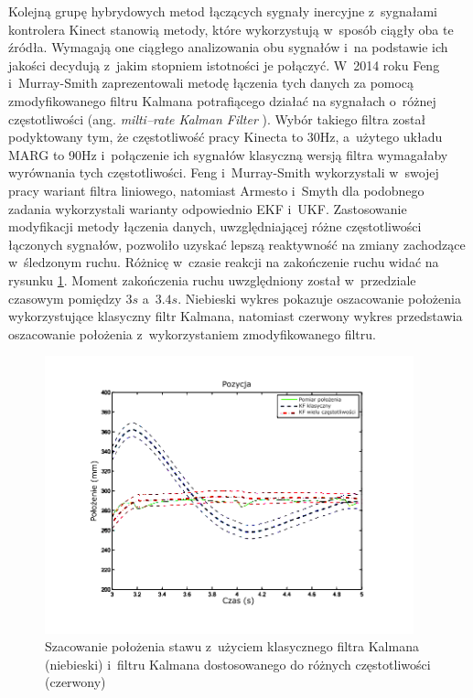 Kolejną grupę hybrydowych metod łączących sygnały inercyjne z~sygnałami kontrolera Kinect stanowią metody, które wykorzystują w~sposób ciągły oba te źródła. Wymagają one ciągłego analizowania obu sygnałów i~na podstawie ich jakości decydują z~jakim stopniem istotności je połączyć. W~2014 roku Feng i~Murray-Smith \cite{Murray-Smith2014} zaprezentowali metodę łączenia tych danych za pomocą zmodyfikowanego filtru Kalmana potrafiącego działać na sygnałach o~różnej częstotliwości (ang. \emph{milti--rate Kalman Filter} \cite{Dhuli2009}). Wybór takiego filtra został podyktowany tym, że częstotliwość pracy Kinecta to 30Hz, a~użytego układu MARG to 90Hz i~połączenie ich sygnałów klasyczną wersją filtra wymagałaby wyrównania tych częstotliwości. Feng i~Murray-Smith wykorzystali w~swojej pracy wariant filtra liniowego, natomiast Armesto i~Smyth dla podobnego zadania wykorzystali warianty odpowiednio EKF\cite{Armesto01062007} i~UKF\cite{Smyth2007}. Zastosowanie modyfikacji metody łączenia danych, uwzględniającej różne częstotliwości łączonych sygnałów, pozwoliło uzyskać lepszą reaktywność na zmiany zachodzące w~śledzonym ruchu. Różnicę w~czasie reakcji na zakończenie ruchu widać na rysunku \ref{fig:literature:feng}. Moment zakończenia ruchu uwzględniony został w~przedziale czasowym pomiędzy $3s$ a~$3.4s$. Niebieski wykres pokazuje oszacowanie położenia wykorzystujące klasyczny filtr Kalmana, natomiast czerwony wykres przedstawia oszacowanie położenia z~wykorzystaniem zmodyfikowanego filtru.
																																																	
\begin{savenotes}
	\begin{figure}[!htp]
		\centering 
		\includegraphics[width=0.95\textwidth]{images/Fig03.png}	
		\caption[Szacowanie położenia stawu z~użyciem klasycznego filtra Kalmana i~filtru Kalmana dostosowanego do różnych częstotliwości]{Szacowanie położenia stawu z~użyciem klasycznego filtra Kalmana (niebieski) i~filtru Kalmana dostosowanego do różnych częstotliwości (czerwony) \cite{Murray-Smith2014}}
		\label{fig:literature:feng}
	\end{figure}
\end{savenotes}
																																																			
